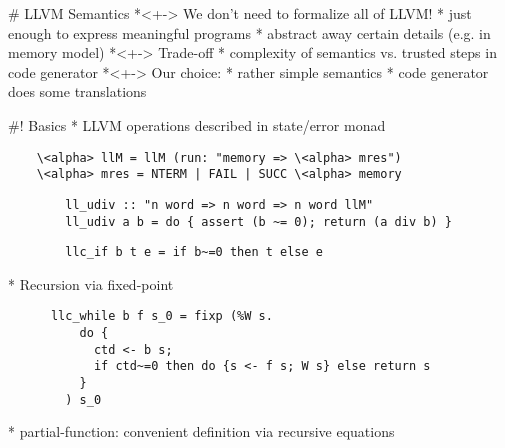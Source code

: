 \documentclass[fleqn]{beamer}
\begin{document}
%
%


\renewcommand{\insertsectitle}{\color{green}{Kernel}}


# LLVM Semantics
  *<+-> We don't need to formalize all of LLVM!
    * just enough to express meaningful programs
    * abstract away certain details (e.g. in memory model)
  *<+-> Trade-off
    * complexity of semantics vs. trusted steps in code generator
  *<+-> Our choice:
    * rather simple semantics
    * code generator does some translations

#! Basics
  * LLVM operations described in state/error monad
    \begin{lstlisting}
    \<alpha> llM = llM (run: "memory => \<alpha> mres")
    \<alpha> mres = NTERM | FAIL | SUCC \<alpha> memory
    \end{lstlisting}

    \pause

      \begin{lstlisting}
        ll_udiv :: "n word => n word => n word llM"
        ll_udiv a b = do { assert (b ~= 0); return (a div b) }
      \end{lstlisting}

    \pause

      \begin{lstlisting}
        llc_if b t e = if b~=0 then t else e
      \end{lstlisting}

    \pause

  * Recursion via fixed-point
    \begin{lstlisting}
      llc_while b f s_0 = fixp (%W s.
          do {
            ctd <- b s;
            if ctd~=0 then do {s <- f s; W s} else return s
          }
        ) s_0
    \end{lstlisting}
    \pause
    * partial-function: convenient definition via recursive equations



%



%
\end{document}

